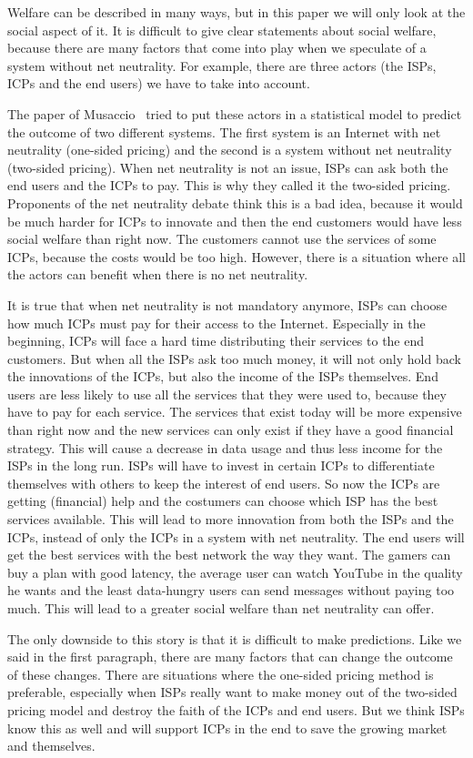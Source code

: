 Welfare can be described in many ways, but in this paper we will only look at the social aspect of it. It is difficult to give clear statements about social welfare, because there are many factors that come into play when we speculate of a system without net neutrality. For example, there are three actors (the \acp{ISP}, \acp{ICP} and the end users) we have to take into account.

The paper of Musaccio~\cite{musacchio2009} tried to put these actors in a statistical model to predict the outcome of two different systems. The first system is an Internet with net neutrality (one-sided pricing) and the second is a system without net neutrality (two-sided pricing). When net neutrality is not an issue, \acp{ISP} can ask both the end users and the \acp{ICP} to pay. This is why they called it the two-sided pricing. Proponents of the net neutrality debate think this is a bad idea, because it would be much harder for \acp{ICP} to innovate and then the end customers would have less social welfare than right now. The customers cannot use the services of some \acp{ICP}, because the costs would be too high. However, there is a situation where all the actors can benefit when there is no net neutrality.

It is true that when net neutrality is not mandatory anymore, \acp{ISP} can choose how much \acp{ICP} must pay for their access to the Internet. Especially in the beginning, \acp{ICP} will face a hard time distributing their services to the end customers. But when all the \acp{ISP} ask too much money, it will not only hold back the innovations of the \acp{ICP}, but also the income of the \acp{ISP} themselves. End users are less likely to use all the services that they were used to, because they have to pay for each service. The services that exist today will be more expensive than right now and the new services can only exist if they have a good financial strategy. This will cause a decrease in data usage and thus less income for the \acp{ISP} in the long run. \acp{ISP} will have to invest in certain \acp{ICP} to differentiate themselves with others to keep the interest of end users. So now the \acp{ICP} are getting (financial) help and the costumers can choose which \ac{ISP} has the best services available. This will lead to more innovation from both the \acp{ISP} and the \acp{ICP}, instead of only the \acp{ICP} in a system with net neutrality. The end users will get the best services with the best network the way they want. The gamers can buy a plan with good latency, the average user can watch YouTube in the quality he wants and the least data-hungry users can send messages without paying too much. This will lead to a greater social welfare than net neutrality can offer.

The only downside to this story is that it is difficult to make predictions. Like we said in the first paragraph, there are many factors that can change the outcome of these changes. There are situations where the one-sided pricing method is preferable, especially when \acp{ISP} really want to make money out of the two-sided pricing model and destroy the faith of the \acp{ICP} and end users. But we think \acp{ISP} know this as well and will support \acp{ICP} in the end to save the growing market and themselves.
